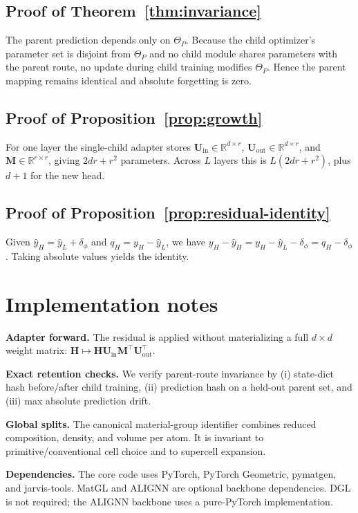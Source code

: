 \documentclass{article}
\theoremstyle{plain}
\theoremstyle{definition}
\theoremstyle{remark}
\begin{document}
\subsection{Proof of Theorem~\ref{thm:invariance}}

The parent prediction depends only on $\Theta_P$. Because the child optimizer's parameter set is disjoint from $\Theta_P$ and no child module shares parameters with the parent route, no update during child training modifies $\Theta_P$. Hence the parent mapping remains identical and absolute forgetting is zero.

\subsection{Proof of Proposition~\ref{prop:growth}}

For one layer the single-child adapter stores $\mathbf U_{\mathrm{in}}\in\mathbb R^{d\times r}$, $\mathbf U_{\mathrm{out}}\in\mathbb R^{d\times r}$, and $\mathbf M\in\mathbb R^{r\times r}$, giving $2dr+r^2$ parameters. Across $L$ layers this is $L(2dr+r^2)$, plus $d+1$ for the new head.

\subsection{Proof of Proposition~\ref{prop:residual-identity}}

Given $\hat y_H=\hat y_L+\delta_\phi$ and $q_H=y_H-\hat y_L$, we have $y_H-\hat y_H = y_H-\hat y_L-\delta_\phi = q_H-\delta_\phi$. Taking absolute values yields the identity.

\section{Implementation notes}
\label{sec:implementation}

\textbf{Adapter forward.} The residual is applied without materializing a full $d\times d$ weight matrix: $\mathbf H\mapsto \mathbf H\mathbf U_{\mathrm{in}}\mathbf M^{\!\top}\mathbf U_{\mathrm{out}}^{\!\top}$.

\textbf{Exact retention checks.} We verify parent-route invariance by (i) state-dict hash before/after child training, (ii) prediction hash on a held-out parent set, and (iii) max absolute prediction drift.

\textbf{Global splits.} The canonical material-group identifier combines reduced composition, density, and volume per atom. It is invariant to primitive/conventional cell choice and to supercell expansion.

\textbf{Dependencies.} The core code uses PyTorch, PyTorch Geometric, pymatgen, and jarvis-tools. MatGL and ALIGNN are optional backbone dependencies. DGL is not required; the ALIGNN backbone uses a pure-PyTorch implementation.
\end{document}

